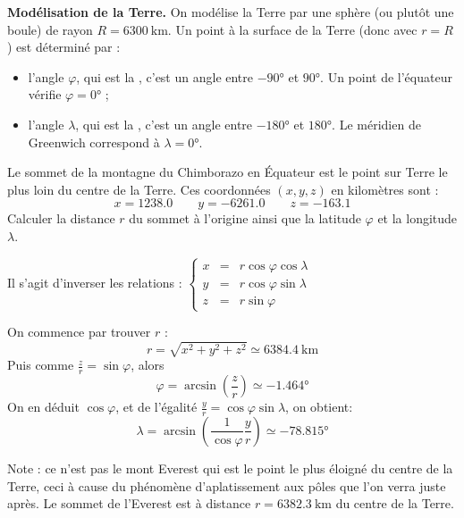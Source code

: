\documentclass[class=report,crop=false]{standalone}
\begin{document}
\bigskip

\textbf{Modélisation de la Terre.}
On modélise la Terre par une sphère (ou plutôt une boule) de rayon
$R = \SI{6300}{\kilo\meter}$.
Un point à la surface de la Terre (donc avec $r=R$) est déterminé
par :
\begin{itemize}
  \item l'angle $\varphi$, qui est la , c'est un angle 
entre $\ang{-90}$ et $\ang{+90}$.  Un point de l'équateur vérifie $\varphi = \ang{0}$ ;
  
  \item l'angle $\lambda$, qui est la , c'est un angle
  entre $\ang{-180}$ et $\ang{+180}$. Le méridien de Greenwich correspond à $\lambda = \ang{0}$.
\end{itemize}


\begin{exemple}
Le sommet de la montagne du Chimborazo en Équateur est 
le point sur Terre le plus loin du centre de la Terre.
Ces coordonnées $(x,y,z)$ en kilomètres sont :
$$x= \num{1238.0} \qquad y =  \num{-6261.0} \qquad  z = \num{-163.1}$$
Calculer la distance $r$ du sommet à l'origine ainsi que la latitude $\varphi$
et la longitude $\lambda$.


Il s'agit d'inverser les relations :
$\left\{\begin{array}{rcl}
x & = & r \cos \varphi \cos \lambda \\
y & = & r \cos \varphi \sin \lambda \\
z & = & r \sin \varphi 
\end{array}\right.$

On commence par trouver $r$ :
$$r = \sqrt{x^ 2+y^ 2+z^2} \simeq \SI{6 384.4}{\kilo\meter}$$
Puis comme $\frac{z}{r} =\sin \varphi$, alors
$$\varphi = \arcsin \left( \frac{z}{r}\right) \simeq \ang{-1.464}$$
On en déduit $\cos\varphi$, 
et de l'égalité $\frac{y}{r}  =  \cos \varphi \sin \lambda$, on obtient:
$$\lambda = \arcsin\left( \frac{1}{\cos\varphi}\frac{y}{r}\right) 
 \simeq \ang{-78.815}$$

Note : ce n'est pas le mont Everest qui est le point le plus éloigné du centre 
de la Terre, ceci à cause du phénomène d'aplatissement aux pôles que l'on verra juste après.
Le sommet de l'Everest est à distance $r= \SI{6 382.3}{\kilo\meter}$ du centre de la Terre.
\end{exemple}


\end{document}
